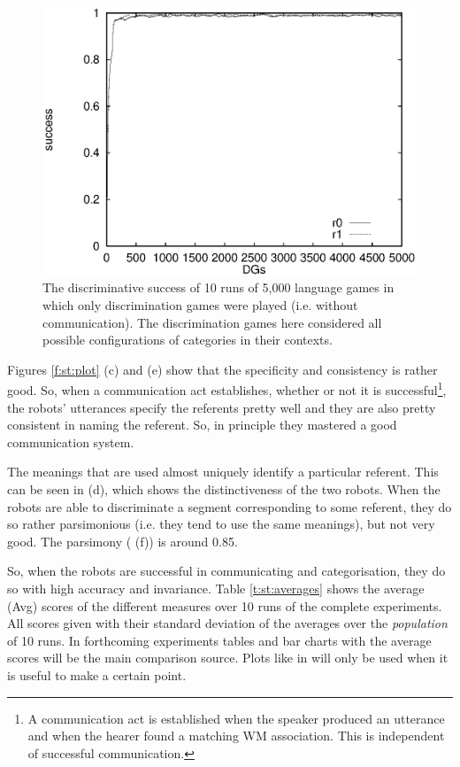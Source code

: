 \begin{figure}[t]
\centerline{\includegraphics[width=12cm]{basic/dsall.eps}}
\caption{The discriminative success of 10 runs of 5,000 language games in which only discrimination games were played (i.e. without communication). The discrimination games here considered all possible configurations of categories in their contexts.}
\label{f:st:ds}
\end{figure}

Figures \ref{f:st:plot} (c) and (e) show that the specificity and consistency is rather good. So, when a communication act establishes, whether or not it is successful\footnote{A communication act is established when the speaker produced an utterance and when the hearer found a matching WM association. This is independent of successful communication.}, the robots' utterances specify the referents pretty well and they are also pretty consistent in naming the referent. So, in principle they mastered a good communication system.

The meanings that are used almost uniquely identify a particular referent. This can be seen in  (d), which shows the distinctiveness of the two robots. When the robots are able to discriminate a segment corresponding to some referent, they do so rather parsimonious (i.e. they tend to use the same meanings), but not very good. The parsimony ( (f)) is around 0.85. 

So, when the robots are successful in communicating and categorisation, they do so with high accuracy and invariance. Table \ref{t:st:averages} shows the average (Avg) scores of the different measures over 10 runs of the complete experiments. All scores given with their standard deviation of the averages over the {\em population} of 10 runs. In forthcoming experiments tables and bar charts with the average scores will be the main comparison source. Plots like in  will only be used when it is useful to make a certain point.

